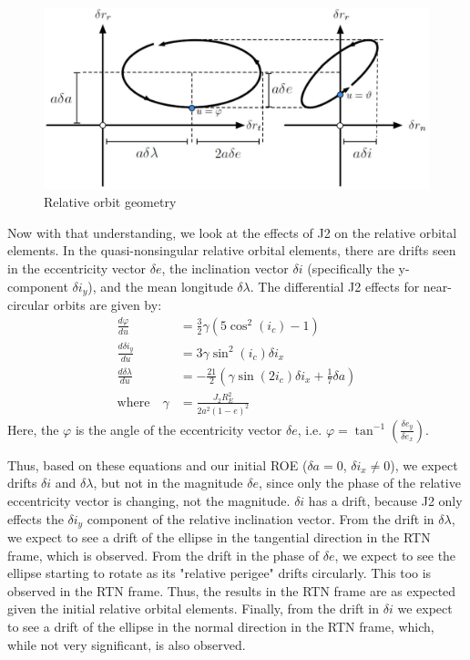 \begin{figure}[H]
    \centering
    \includegraphics[width=0.75\linewidth]{LaTeX/Figures/RelOrbitGeometry.jpg}
    \caption{Relative orbit geometry}
    \label{fig:rel_geometry}
\end{figure}

Now with that understanding, we look at the effects of J2 on the relative orbital elements. In the quasi-nonsingular relative orbital elements, there are drifts seen in the eccentricity vector $\delta e$, the inclination vector $\delta i$ (specifically the y-component $\delta i_y$), and the mean longitude $\delta \lambda$. The differential J2 effects for near-circular orbits are given by:
\begin{align}
    \frac{d \varphi}{d u} &= \frac{3}{2} \gamma (5\cos^2(i_c) - 1) \\
    \frac{d \delta i_y}{d u} &= 3\gamma \sin^2(i_c) \delta i_x \label{eq:drift_in_rel_i} \\
    \frac{d \delta \lambda}{d u} &= -\frac{21}{2}\left(\gamma \sin(2i_c)\delta i_x 
+ \frac{1}{7} \delta a\right) \label{eq:drift_in_lambda_rel}\\
    \text{where} \quad \gamma  &= \frac{J_2 R_E^2}{2 a^2 (1 - e)^2}
\end{align}
Here, the $\varphi$ is the angle of the eccentricity vector $\delta e$, i.e. $\varphi = \tan^{-1}\left(\frac{\delta e_y}{\delta e_x}\right)$.

Thus, based on these equations and our initial ROE ($\delta a = 0$, $\delta i_x \neq 0$), we expect drifts $\delta i$ and $\delta \lambda$, but not in the magnitude $\delta e$, since only the phase of the relative eccentricity vector is changing, not the magnitude. $\delta i$ has a drift, because J2 only effects the $\delta i_y$ component of the relative inclination vector. From the drift in $\delta \lambda$, we expect to see a drift of the ellipse in the tangential direction in the RTN frame, which is observed. From the drift in the phase of $\delta e$, we expect to see the ellipse starting to rotate as its "relative perigee" drifts circularly. This too is observed in the RTN frame. Thus, the results in the RTN frame are as expected given the initial relative orbital elements. Finally, from the drift in $\delta i$ we expect to see a drift of the ellipse in the normal direction in the RTN frame, which, while not very significant, is also observed. 


